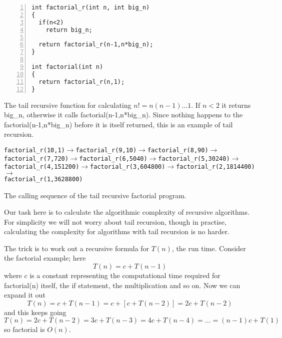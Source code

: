 \documentclass[11pt,a4paper]{scrartcl}
\begin{document}
\begin{table}
\begin{lstlisting}[numbers=left]
int factorial_r(int n, int big_n)
{
  if(n<2)
    return big_n;

  return factorial_r(n-1,n*big_n);
}

int factorial(int n)
{
  return factorial_r(n,1);
}
\end{lstlisting}
\caption{The tail recursive function for calculating $n!=n(n-1)\ldots
  1$. If $n<2$ it returns big\_n, otherwise it calls
  factorial(n-1,n*big\_n). Since nothing happens to the
  factorial(n-1,n*big\_n) before it is itself returned, this is an
  example of tail recursion.\label{c_factorial_tail}}
\end{table}

\begin{table}
\texttt{factorial\_r(10,1)}$\rightarrow$\texttt{factorial\_r(9,10)}$\rightarrow$\texttt{factorial\_r(8,90)}$\rightarrow$\\
\texttt{factorial\_r(7,720)}$\rightarrow$\texttt{factorial\_r(6,5040)}$\rightarrow$\texttt{factorial\_r(5,30240)}$\rightarrow$\\
\texttt{factorial\_r(4,151200)}$\rightarrow$\texttt{factorial\_r(3,604800)}$\rightarrow$\texttt{factorial\_r(2,1814400)}$\rightarrow$\\
\texttt{factorial\_r(1,3628800)}
\caption{The calling sequence of the tail recursive factorial program.\label{calling}}
\end{table}

Our task here is to calculate the algorithmic complexity of recursive
algorithms. For simplicity we will not worry about tail recursion,
though in practise, calculating the complexity for algorithms with
tail recursion is no harder.

The trick is to work out a recursive formula for $T(n)$, the run
time. Consider the factorial example; here
\begin{equation}
T(n)=c+T(n-1)
\end{equation}
where $c$ is a constant representing the computational time required
for factorial(n) itself, the if statement, the multiplication and so
on. Now we can expand it out
\begin{equation}
T(n)=c+T(n-1)=c+[c+T(n-2)]=2c+T(n-2)
\end{equation}
and this keeps going
\begin{equation}
T(n)=2c+T(n-2)=3c+T(n-3)=4c+T(n-4)=\ldots = (n-1)c+T(1)
\end{equation}
so factorial is $O(n)$. 
\end{document}
